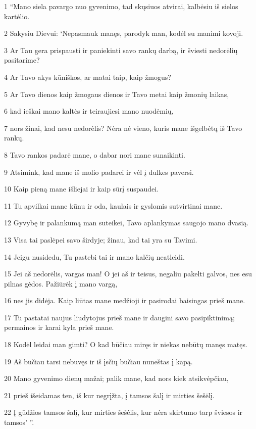 \par 1 “Mano siela pavargo nuo gyvenimo, tad skųsiuos atvirai, kalbėsiu iš sielos kartėlio. 
\par 2 Sakysiu Dievui: ‘Nepasmauk manęs, parodyk man, kodėl su manimi kovoji. 
\par 3 Ar Tau gera prispausti ir paniekinti savo rankų darbą, ir šviesti nedorėlių pasitarime? 
\par 4 Ar Tavo akys kūniškos, ar matai taip, kaip žmogus? 
\par 5 Ar Tavo dienos kaip žmogaus dienos ir Tavo metai kaip žmonių laikas, 
\par 6 kad ieškai mano kaltės ir teiraujiesi mano nuodėmių, 
\par 7 nors žinai, kad nesu nedorėlis? Nėra nė vieno, kuris mane išgelbėtų iš Tavo rankų. 
\par 8 Tavo rankos padarė mane, o dabar nori mane sunaikinti. 
\par 9 Atsimink, kad mane iš molio padarei ir vėl į dulkes paversi. 
\par 10 Kaip pieną mane išliejai ir kaip sūrį suspaudei. 
\par 11 Tu apvilkai mane kūnu ir oda, kaulais ir gyslomis sutvirtinai mane. 
\par 12 Gyvybę ir palankumą man suteikei, Tavo aplankymas saugojo mano dvasią. 
\par 13 Visa tai paslėpei savo širdyje; žinau, kad tai yra su Tavimi. 
\par 14 Jeigu nusidedu, Tu pastebi tai ir mano kalčių neatleidi. 
\par 15 Jei aš nedorėlis, vargas man! O jei aš ir teisus, negaliu pakelti galvos, nes esu pilnas gėdos. Pažiūrėk į mano vargą, 
\par 16 nes jis didėja. Kaip liūtas mane medžioji ir pasirodai baisingas prieš mane. 
\par 17 Tu pastatai naujus liudytojus prieš mane ir daugini savo pasipiktinimą; permainos ir karai kyla prieš mane. 
\par 18 Kodėl leidai man gimti? O kad būčiau miręs ir niekas nebūtų manęs matęs. 
\par 19 Aš būčiau tarsi nebuvęs ir iš įsčių būčiau nuneštas į kapą. 
\par 20 Mano gyvenimo dienų mažai; palik mane, kad nors kiek atsikvėpčiau, 
\par 21 prieš išeidamas ten, iš kur negrįžta, į tamsos šalį ir mirties šešėlį. 
\par 22 Į gūdžios tamsos šalį, kur mirties šešėlis, kur nėra skirtumo tarp šviesos ir tamsos’ ”.



